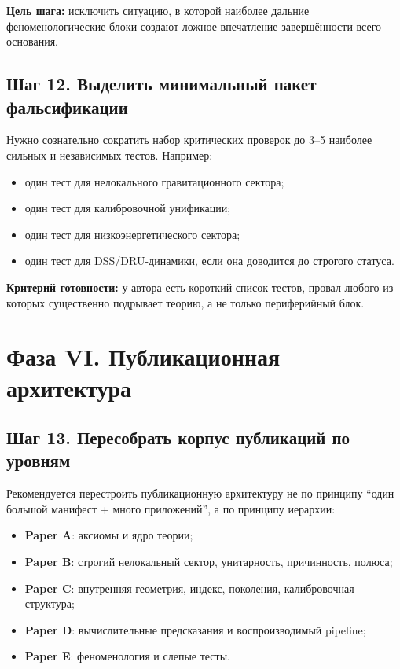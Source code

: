 \documentclass[12pt,a4paper]{article}
\begin{document}
\textbf{Цель шага:} исключить ситуацию, в которой наиболее дальние феноменологические блоки создают ложное впечатление завершённости всего основания.

\subsection{Шаг 12. Выделить минимальный пакет фальсификации}

Нужно сознательно сократить набор критических проверок до 3--5 наиболее сильных и независимых тестов. Например:
\begin{itemize}
    \item один тест для нелокального гравитационного сектора;
    \item один тест для калибровочной унификации;
    \item один тест для низкоэнергетического сектора;
    \item один тест для DSS/DRU-динамики, если она доводится до строгого статуса.
\end{itemize}

\textbf{Критерий готовности:} у автора есть короткий список тестов, провал любого из которых существенно подрывает теорию, а не только периферийный блок.

\section{Фаза VI. Публикационная архитектура}

\subsection{Шаг 13. Пересобрать корпус публикаций по уровням}

Рекомендуется перестроить публикационную архитектуру не по принципу ``один большой манифест + много приложений'', а по принципу иерархии:
\begin{itemize}
    \item \textbf{Paper A}: аксиомы и ядро теории;
    \item \textbf{Paper B}: строгий нелокальный сектор, унитарность, причинность, полюса;
    \item \textbf{Paper C}: внутренняя геометрия, индекс, поколения, калибровочная структура;
    \item \textbf{Paper D}: вычислительные предсказания и воспроизводимый pipeline;
    \item \textbf{Paper E}: феноменология и слепые тесты.
\end{itemize}
\end{document}
